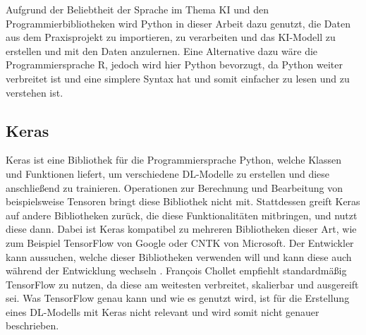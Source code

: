 Aufgrund der Beliebtheit der Sprache im Thema \ac{KI} und den Programmierbibliotheken wird Python in dieser Arbeit dazu genutzt,
die Daten aus dem Praxisprojekt zu importieren, zu verarbeiten und das \ac{KI}-Modell zu erstellen und mit den Daten anzulernen.
Eine Alternative dazu wäre die Programmiersprache R, jedoch wird hier Python bevorzugt, da Python weiter verbreitet ist und eine simplere Syntax hat und somit 
einfacher zu lesen und zu verstehen ist.

\subsection{Keras}
\label{chap:Keras}
Keras ist eine Bibliothek für die Programmiersprache Python, welche Klassen und Funktionen liefert, um verschiedene \ac{DL}-Modelle zu erstellen
und diese anschließend zu trainieren. Operationen zur Berechnung und Bearbeitung von beispielsweise Tensoren bringt diese Bibliothek nicht mit.
Stattdessen greift Keras auf andere Bibliotheken zurück, die diese Funktionalitäten mitbringen, und nutzt diese dann. Dabei ist Keras kompatibel zu mehreren
Bibliotheken dieser Art, wie zum Beispiel TensorFlow von Google oder CNTK von Microsoft. Der Entwickler kann aussuchen, welche dieser Bibliotheken
verwenden will und kann diese auch während der Entwicklung wechseln \cite[vgl. S.89ff.]{DL_PY}. François Chollet empfiehlt standardmäßig TensorFlow zu nutzen, da diese 
\glqq am weitesten verbreitet, skalierbar und ausgereift\grqq{}\cite[S.91]{DL_PY} sei. Was TensorFlow genau kann und wie es genutzt wird, ist für die Erstellung eines
\ac{DL}-Modells mit Keras nicht relevant und wird somit nicht genauer beschrieben.


